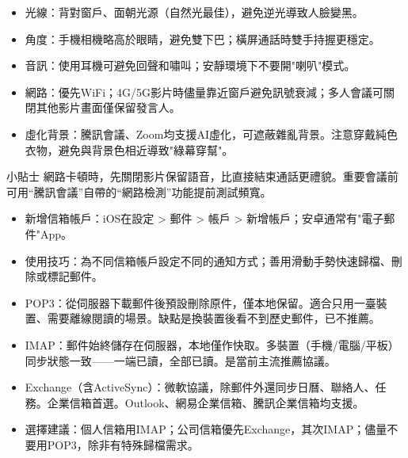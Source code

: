 
\begin{itemize}
  \item 光線：背對窗戶、面朝光源（自然光最佳），避免逆光導致人臉變黑。
  \item 角度：手機相機略高於眼睛，避免雙下巴；橫屏通話時雙手持握更穩定。
  \item 音訊：使用耳機可避免回聲和嘯叫；安靜環境下不要開"喇叭"模式。
  \item 網路：優先WiFi；4G/5G影片時儘量靠近窗戶避免訊號衰減；多人會議可關閉其他影片畫面僅保留發言人。
  \item 虛化背景：騰訊會議、Zoom均支援AI虛化，可遮蔽雜亂背景。注意穿戴純色衣物，避免與背景色相近導致"綠幕穿幫"。
\end{itemize}

\begin{tcbinfo}{小貼士}
網路卡頓時，先關閉影片保留語音，比直接結束通話更禮貌。重要會議前可用“騰訊會議”自帶的“網路檢測”功能提前測試頻寬。

\end{tcbinfo}


\begin{itemize}
  \item 新增信箱帳戶：iOS在設定 > 郵件 > 帳戶 > 新增帳戶；安卓通常有"電子郵件"App。
  \item 使用技巧：為不同信箱帳戶設定不同的通知方式；善用滑動手勢快速歸檔、刪除或標記郵件。
\end{itemize}


\begin{itemize}
  \item POP3：從伺服器下載郵件後預設刪除原件，僅本地保留。適合只用一臺裝置、需要離線閱讀的場景。缺點是換裝置後看不到歷史郵件，已不推薦。
  \item IMAP：郵件始終儲存在伺服器，本地僅作快取。多裝置（手機/電腦/平板）同步狀態一致——一端已讀，全部已讀。是當前主流推薦協議。
  \item Exchange（含ActiveSync）：微軟協議，除郵件外還同步日曆、聯絡人、任務。企業信箱首選。Outlook、網易企業信箱、騰訊企業信箱均支援。
  \item 選擇建議：個人信箱用IMAP；公司信箱優先Exchange，其次IMAP；儘量不要用POP3，除非有特殊歸檔需求。
\end{itemize}


